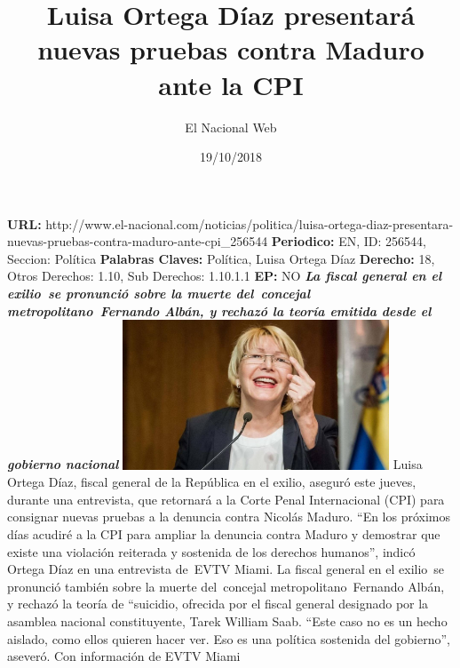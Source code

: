 \documentclass{article}%
\title{\textbf{Luisa Ortega Díaz presentará nuevas pruebas contra Maduro ante la CPI}}%
\author{El Nacional Web}%
\date{19/10/2018}%
\begin{document}
%
\normalsize%
\maketitle%
\textbf{URL: }%
http://www.el{-}nacional.com/noticias/politica/luisa{-}ortega{-}diaz{-}presentara{-}nuevas{-}pruebas{-}contra{-}maduro{-}ante{-}cpi\_256544\newline%
%
\textbf{Periodico: }%
EN, %
ID: %
256544, %
Seccion: %
Política\newline%
%
\textbf{Palabras Claves: }%
Política, Luisa Ortega Díaz\newline%
%
\textbf{Derecho: }%
18, %
Otros Derechos: %
1.10, %
Sub Derechos: %
1.10.1.1\newline%
%
\textbf{EP: }%
NO\newline%
\newline%
%
\textbf{\textit{La fiscal general en el exilio~se pronunció sobre la muerte del~concejal metropolitano~Fernando Albán, y rechazó la teoría emitida desde el gobierno nacional}}%
\newline%
\newline%
%
\includegraphics[width=300px]{123.jpg}%
\newline%
%
Luisa Ortega Díaz, fiscal general de la República en el exilio, aseguró este jueves, durante una entrevista, que retornará a la Corte Penal Internacional (CPI) para consignar nuevas pruebas a la denuncia contra Nicolás Maduro.%
\newline%
%
“En los próximos días acudiré a la CPI para ampliar la denuncia contra Maduro y demostrar que existe una violación reiterada y sostenida de los derechos humanos”, indicó Ortega Díaz en una entrevista de~EVTV Miami.%
\newline%
%
La fiscal general en el exilio~se pronunció también sobre la muerte del~concejal metropolitano~Fernando Albán, y rechazó la teoría de “suicidio, ofrecida por el fiscal general designado por la asamblea nacional constituyente, Tarek William Saab.%
\newline%
%
“Este caso no es un hecho aislado, como ellos quieren hacer ver. Eso es una política sostenida del gobierno”, aseveró.%
\newline%
%
Con información de EVTV Miami%
\newline%
%
\end{document}
